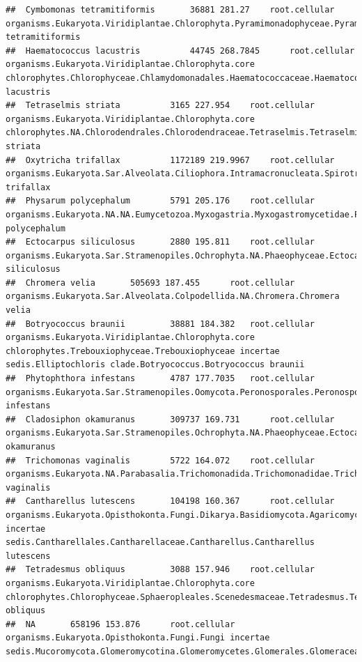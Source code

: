 \documentclass{article}\usepackage[]{graphicx}\usepackage[]{color}
\makeatletter
\newenvironment{kframe}{%
 \def\at@end@of@kframe{}%
 \ifinner\ifhmode%
  \def\at@end@of@kframe{\end{minipage}}%
  \begin{minipage}{\columnwidth}%
 \fi\fi%
 \def\FrameCommand##1{\hskip\@totalleftmargin \hskip-\fboxsep
 \colorbox{shadecolor}{##1}\hskip-\fboxsep
     \hskip-\linewidth \hskip-\@totalleftmargin \hskip\columnwidth}%
 \MakeFramed {\advance\hsize-\width
   \@totalleftmargin\z@ \linewidth\hsize
   \@setminipage}}%
 {\par\unskip\endMakeFramed%
 \at@end@of@kframe}
\newenvironment{knitrout}{}{} %
\makeatother
\begin{document}
\begin{knitrout}
\begin{kframe}
\begin{verbatim}
##  Cymbomonas tetramitiformis 		 36881 281.27 	 root.cellular organisms.Eukaryota.Viridiplantae.Chlorophyta.Pyramimonadophyceae.Pyramimonadales.NA.Cymbomonas.Cymbomonas tetramitiformis
##  Haematococcus lacustris 		 44745 268.7845 	 root.cellular organisms.Eukaryota.Viridiplantae.Chlorophyta.core chlorophytes.Chlorophyceae.Chlamydomonadales.Haematococcaceae.Haematococcus.Haematococcus lacustris
##  Tetraselmis striata 		 3165 227.954 	 root.cellular organisms.Eukaryota.Viridiplantae.Chlorophyta.core chlorophytes.NA.Chlorodendrales.Chlorodendraceae.Tetraselmis.Tetraselmis striata
##  Oxytricha trifallax 		 1172189 219.9967 	 root.cellular organisms.Eukaryota.Sar.Alveolata.Ciliophora.Intramacronucleata.Spirotrichea.Stichotrichia.NA.Oxytrichidae.Oxytrichinae.Oxytricha.Oxytricha trifallax
##  Physarum polycephalum 		 5791 205.176 	 root.cellular organisms.Eukaryota.NA.NA.Eumycetozoa.Myxogastria.Myxogastromycetidae.Physariida.Physaraceae.Physarum.Physarum polycephalum
##  Ectocarpus siliculosus 		 2880 195.811 	 root.cellular organisms.Eukaryota.Sar.Stramenopiles.Ochrophyta.NA.Phaeophyceae.Ectocarpales.Ectocarpaceae.Ectocarpus.Ectocarpus siliculosus
##  Chromera velia 		 505693 187.455 	 root.cellular organisms.Eukaryota.Sar.Alveolata.Colpodellida.NA.Chromera.Chromera velia
##  Botryococcus braunii 		 38881 184.382 	 root.cellular organisms.Eukaryota.Viridiplantae.Chlorophyta.core chlorophytes.Trebouxiophyceae.Trebouxiophyceae incertae sedis.Elliptochloris clade.Botryococcus.Botryococcus braunii
##  Phytophthora infestans 		 4787 177.7035 	 root.cellular organisms.Eukaryota.Sar.Stramenopiles.Oomycota.Peronosporales.Peronosporaceae.Phytophthora.Phytophthora infestans
##  Cladosiphon okamuranus 		 309737 169.731 	 root.cellular organisms.Eukaryota.Sar.Stramenopiles.Ochrophyta.NA.Phaeophyceae.Ectocarpales.Chordariaceae.Cladosiphon.Cladosiphon okamuranus
##  Trichomonas vaginalis 		 5722 164.072 	 root.cellular organisms.Eukaryota.NA.Parabasalia.Trichomonadida.Trichomonadidae.Trichomonas.Trichomonas vaginalis
##  Cantharellus lutescens 		 104198 160.367 	 root.cellular organisms.Eukaryota.Opisthokonta.Fungi.Dikarya.Basidiomycota.Agaricomycotina.Agaricomycetes.Agaricomycetes incertae sedis.Cantharellales.Cantharellaceae.Cantharellus.Cantharellus lutescens
##  Tetradesmus obliquus 		 3088 157.946 	 root.cellular organisms.Eukaryota.Viridiplantae.Chlorophyta.core chlorophytes.Chlorophyceae.Sphaeropleales.Scenedesmaceae.Tetradesmus.Tetradesmus obliquus
##  NA 		 658196 153.876 	 root.cellular organisms.Eukaryota.Opisthokonta.Fungi.Fungi incertae sedis.Mucoromycota.Glomeromycotina.Glomeromycetes.Glomerales.Glomeraceae.Glomus.NA

\end{verbatim}
\end{kframe}
\end{knitrout}
\end{document}

